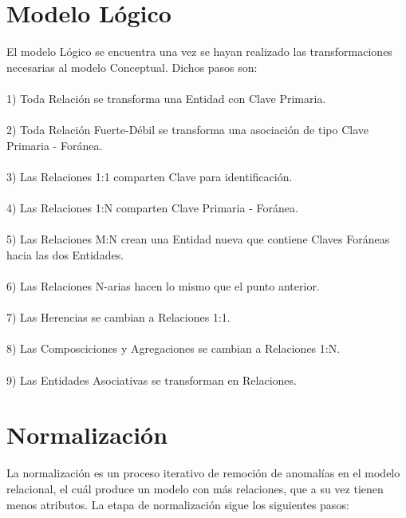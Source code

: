 \documentclass[12pt]{article}
\begin{document}
\section*{Modelo Lógico}
El modelo Lógico se encuentra una vez se hayan realizado las transformaciones necesarias al
modelo Conceptual. Dichos pasos son:
\\\\
1) Toda Relación se transforma una Entidad con Clave Primaria.
\\\\
2) Toda Relación Fuerte-Débil se transforma una asociación de tipo Clave Primaria - Foránea.
\\\\
3) Las Relaciones 1:1 comparten Clave para identificación.
\\\\
4) Las Relaciones 1:N comparten Clave Primaria - Foránea.
\\\\
5) Las Relaciones M:N crean una Entidad nueva que contiene Claves Foráneas hacia las dos 
Entidades.
\\\\
6) Las Relaciones N-arias hacen lo mismo que el punto anterior.
\\\\
7) Las Herencias se cambian a Relaciones 1:1.
\\\\
8) Las Composciciones y Agregaciones se cambian a Relaciones 1:N.
\\\\
9) Las Entidades Asociativas se transforman en Relaciones.

\newpage

\section*{Normalización}
La normalización es un proceso iterativo de remoción de anomalías en el modelo relacional,
el cuál produce un modelo con más relaciones, que a su vez tienen menos atributos. La etapa
de normalización sigue los siguientes pasos:
\end{document}
